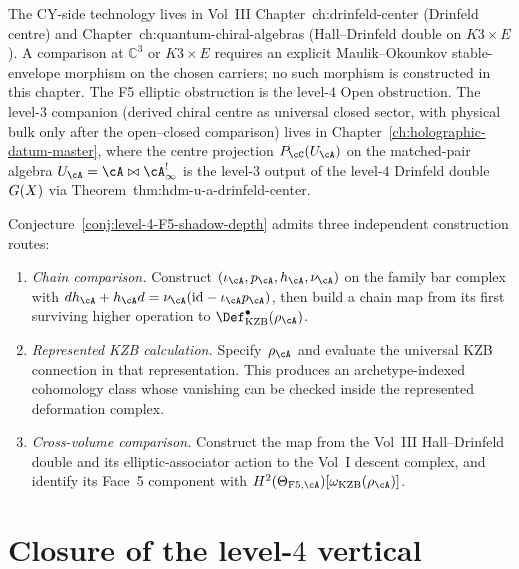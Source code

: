 \begin{remark}
\label{rem:level-4-cross-volume}
The CY-side technology lives in Vol~III Chapter~\textup{ch:drinfeld-center}
(Drinfeld centre) and Chapter~\textup{ch:quantum-chiral-algebras}
(Hall--Drinfeld double on $K3\times E$).  A comparison at
$\mathbb C^{3}$ or $K3\times E$ requires an explicit
Maulik--Okounkov stable-envelope morphism on the chosen carriers; no
such morphism is constructed in this chapter.  The F5 elliptic
obstruction is the level-$4$ Open obstruction. The level-$3$
companion (derived chiral centre as universal closed sector, with
physical bulk only after the open--closed comparison) lives in
Chapter~\ref{ch:holographic-datum-master}, where the centre
projection $P_\cC(U_\cA)$ on the matched-pair algebra
$U_\cA = \cA\bowtie\cA^!_\infty$ is the level-$3$ output of the
level-$4$ Drinfeld double $G(X)$ via
Theorem~\textup{thm:hdm-u-a-drinfeld-center}.
\end{remark}

\begin{remark}
\label{rem:level-4-three-paths}
Conjecture~\ref{conj:level-4-F5-shadow-depth} admits three
independent construction routes:
\begin{enumerate}[label=\textup{(\roman*)},leftmargin=*]
\item \emph{Chain comparison.}  Construct
$(\iota_\cA,p_\cA,h_\cA,\nu_\cA)$ on the family bar complex with
$dh_\cA+h_\cA d=\nu_\cA(\mathrm{id}-\iota_\cA p_\cA)$, then build a
chain map from its first surviving higher operation to
$\Def_{\mathrm{KZB}}^\bullet(\rho_\cA)$.
\item \emph{Represented KZB calculation.}  Specify~$\rho_\cA$ and
evaluate the universal KZB connection in that representation.  This
produces an archetype-indexed cohomology class whose vanishing can be
checked inside the represented deformation complex.
\item \emph{Cross-volume comparison.}  Construct the map from the
Vol~III Hall--Drinfeld double and its elliptic-associator action to the
Vol~I descent complex, and identify its Face~5 component with
$H^2(\Theta_{\mathrm{F5},\cA})
[\omega_{\mathrm{KZB}}(\rho_\cA)]$.
\end{enumerate}
\end{remark}

\section{Closure of the level-$4$ vertical}
\label{sec:level-4-closure}

